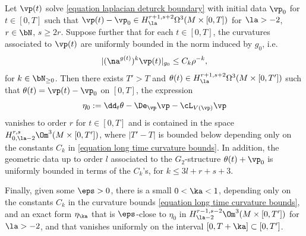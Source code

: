 \documentclass[hidelinks, 12pt, oneside, reqno]{amsart}
\begin{document}
\begin{lem}\label{lemma approx extension}
     Let $\vp(t)$ solve \eqref{equation laplacian deturck boundary} with initial data $\vp_0$ for $t \in [0,T]$ such that $\vp(t) - \vp_0 \in H^{r+1,s+2}_{\la}\Omega^3(M \times [0,T])$ for $\la > -2$, $r \in \bN$, $s \ge 2r$. Suppose further that for each $t \in [0,T]$, the curvatures associated to $\vp(t)$ are uniformly bounded in the norm induced by $g_0$, i.e.
    \begin{equation}\label{equation long time curvature bounds}
    |(\na^{g(t)})^k \vp(t)|_{g_0} \le C_k \rho^{-k},  
    \end{equation}
    for $k \in \bN_{\ge 0}$. Then there exists $T' > T$ and $\theta(t) \in H^{r+1,s+2}_{\la}\Omega^3(M \times [0,T'])$ such that $\theta(t) = \vp(t) - \vp_0$ on $[0,T]$, the expression 
    \[
    \eta_0 := \dd_t \theta - \De_\vp \vp - \cL_{V(\vp)}\vp
    \]
    vanishes to order $r$ for $t \in [0,T]$ and is contained in the space $H^{r,s}_{0,\la-2}\Om^3(M \times [0,T'])$, where $|T' - T|$ is bounded below depending  only on the constants $C_k$ in \eqref{equation long time curvature bounds}. In addition, the geometric data up to order $l$ associated to the $G_2$-structure $\theta(t) + \vp_0$ is uniformly bounded in terms of the $C_k$'s, for $k \le 3l + r + s + 3$. 
    
    Finally, given some $\eps > 0$, there is a small $0 < \ka < 1$, depending only on the constants $C_k$ in the curvature bounds \eqref{equation long time curvature bounds}, and an exact form $\eta_\ka$ that is $\eps$-close to $\eta_0$ in $H^{r-1,s-2}_{\la-2}\Om^3(M \times [0,T'])$ for $\la > -2$, and that vanishes uniformly on the interval $[0,T + \ka] \subset [0,T']$.
\end{lem}
\end{document}
